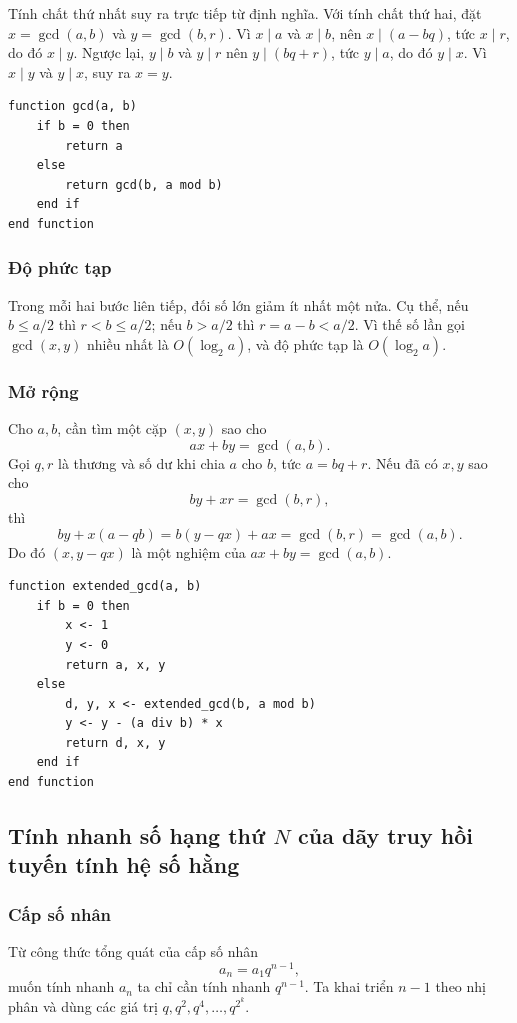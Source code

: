 \documentclass[11pt]{article}
\begin{document}
Tính chất thứ nhất suy ra trực tiếp từ định nghĩa. Với tính chất thứ hai, đặt
$x=\gcd(a,b)$ và $y=\gcd(b,r)$. Vì $x\mid a$ và $x\mid b$, nên
$x\mid(a-bq)$, tức $x\mid r$, do đó $x\mid y$. Ngược lại, $y\mid b$ và
$y\mid r$ nên $y\mid(bq+r)$, tức $y\mid a$, do đó $y\mid x$. Vì $x\mid y$ và
$y\mid x$, suy ra $x=y$.

\begin{lstlisting}
function gcd(a, b)
    if b = 0 then
        return a
    else
        return gcd(b, a mod b)
    end if
end function
\end{lstlisting}

\subsubsection{Độ phức tạp}

Trong mỗi hai bước liên tiếp, đối số lớn giảm ít nhất một nửa. Cụ thể, nếu
$b\le a/2$ thì $r<b\le a/2$; nếu $b>a/2$ thì $r=a-b<a/2$. Vì thế số lần gọi
$\gcd(x,y)$ nhiều nhất là $O(\log_2 a)$, và độ phức tạp là $O(\log_2 a)$.

\subsubsection{Mở rộng}

Cho $a,b$, cần tìm một cặp $(x,y)$ sao cho
\[
  ax+by=\gcd(a,b).
\]
Gọi $q,r$ là thương và số dư khi chia $a$ cho $b$, tức $a=bq+r$. Nếu đã có
$x,y$ sao cho
\[
  by+xr=\gcd(b,r),
\]
thì
\[
  by+x(a-qb)=b(y-qx)+ax=\gcd(b,r)=\gcd(a,b).
\]
Do đó $(x,y-qx)$ là một nghiệm của $ax+by=\gcd(a,b)$.

\begin{lstlisting}
function extended_gcd(a, b)
    if b = 0 then
        x <- 1
        y <- 0
        return a, x, y
    else
        d, y, x <- extended_gcd(b, a mod b)
        y <- y - (a div b) * x
        return d, x, y
    end if
end function
\end{lstlisting}

\subsection{Tính nhanh số hạng thứ \texorpdfstring{$N$}{N} của dãy truy hồi tuyến tính hệ số hằng}

\subsubsection{Cấp số nhân}

Từ công thức tổng quát của cấp số nhân
\[
  a_n=a_1q^{n-1},
\]
muốn tính nhanh $a_n$ ta chỉ cần tính nhanh $q^{n-1}$. Ta khai triển $n-1$
theo nhị phân và dùng các giá trị $q,q^2,q^4,\ldots,q^{2^k}$.
\end{document}
